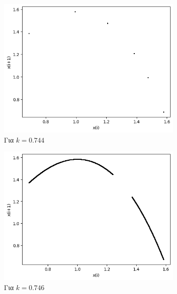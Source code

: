 \begin{figure}[ht]
\begin{subfigure}[b]{0.4\textwidth}
		\includegraphics[width=\textwidth]{LateX images/graphs q14/g19}
		\caption{Για $k=0.744$}
		\label{f:k76}
	\end{subfigure}
	\hfill
	\begin{subfigure}[b]{0.4\textwidth}
		\centering
		\includegraphics[width=\textwidth]{LateX images/graphs q14/g20}
		\caption{Για $k=0.746$}
		\label{f:k77}
	\end{subfigure}
	\hfill
	\begin{subfigure}[b]{0.4\textwidth}
		\centering

\end{subfigure}
\end{figure}
